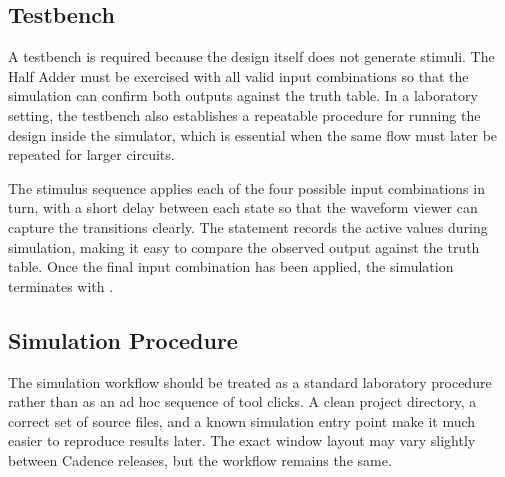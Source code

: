 \subsection{Testbench}
A testbench is required because the design itself does not generate stimuli. The Half Adder must be
exercised with all valid input combinations so that the simulation can confirm both outputs against
the truth table. In a laboratory setting, the testbench also establishes a repeatable procedure for
running the design inside the simulator, which is essential when the same flow must later be repeated
for larger circuits.\\


\noindent The stimulus sequence applies each of the four possible input combinations in turn, with a
short delay between each state so that the waveform viewer can capture the transitions clearly. The
 statement records the active values during simulation, making it easy to compare
the observed output against the truth table. Once the final input combination has been applied, the
simulation terminates with .

\subsection{Simulation Procedure}
The simulation workflow should be treated as a standard laboratory procedure rather than as an ad hoc
sequence of tool clicks. A clean project directory, a correct set of source files, and a known
simulation entry point make it much easier to reproduce results later. The exact window layout may
vary slightly between Cadence releases, but the workflow remains the same.\\


